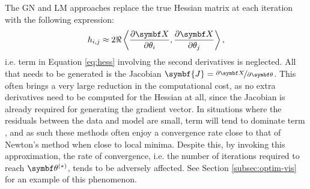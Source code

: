 The \ac{GN} and \ac{LM} approaches replace the true Hessian matrix at each
iteration with the following expression:
\begin{equation}
    h_{i,j} \approx 2 \Re
        \left\langle
            \frac{\partial \bX}{\partial \theta_i},
            \frac{\partial \bX}{\partial \theta_j}
        \right\rangle,
    \label{eq:hess-approx}
\end{equation}
i.e. term  in Equation \ref{eq:hess} involving the second derivatives is
neglected. All that needs to be generated is the Jacobian
$\symbf{J} = \nicefrac{\partial \bX}{\partial \bth}$. This often
brings a very large reduction in the computational cost, as no extra
derivatives need to be computed for the Hessian at all, since the Jacobian is
already required for generating the gradient vector.
In situations where the residuals between the data and model are small, term
 will tend to dominate term , and as such these methods
often enjoy a convergence rate close to that of Newton's method when close to
local minima. Despite this, by invoking this approximation, the rate of
convergence, i.e. the number of iterations required to reach $\bthstar$, tends
to be adversely affected. See Section \ref{subsec:optim-vis} for an example of
this phenomenon.

